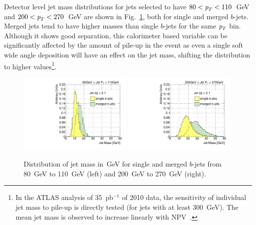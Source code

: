 Detector level jet mass distributions for jets selected to have $80 < {\emph{p}_{T}} < 110$~GeV and $200 < {\emph{p}_{T}} < 270$~GeV are shown in Fig.~\ref{fig:masssinglemerged}, both for single and merged $b$-jets. Merged jets tend to have higher masses than single $b$-jets for the same ${\emph{p}_{T}}$ bin.  
Although it shows good separation, this calorimeter based variable %
can be significantly affected by the amount of pile-up in the event as even a single soft wide angle deposition will have an effect on the jet mass, shifting the distribution to higher values\footnote{In the ATLAS analysis of 35~pb$^{-1}$ of 2010 data, the sensitivity of individual jet mass to pile-up is directly tested (for jets with at least 300~GeV). The mean jet mass is observed to increase linearly with NPV~\cite{ATLAS-CONF-2011-073}.}. %

\begin{figure}[tp]
\centering
\includegraphics[width=0.49\textwidth]{FIGS/VarsSingleMerged/JetMass080.pdf}
\includegraphics[width=0.49\textwidth]{FIGS/VarsSingleMerged/JetMass200.pdf}
\caption{Distribution of jet mass in~GeV for single and merged $b$-jets from 80~GeV to 110~GeV (left) and 200~GeV to 270~GeV (right).}
\label{fig:masssinglemerged}
\end{figure}


